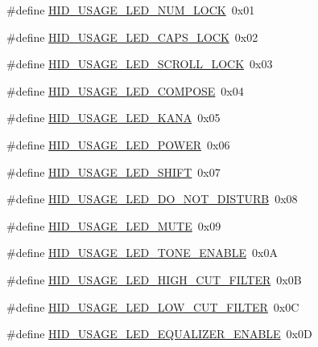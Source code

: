 \begin{DoxyCompactItemize}
\item 
\#define \hyperlink{group__USBD__HID_ga36ce120868adf30bbd161bb7dc158381}{H\-I\-D\-\_\-\-U\-S\-A\-G\-E\-\_\-\-L\-E\-D\-\_\-\-N\-U\-M\-\_\-\-L\-O\-C\-K}~0x01
\item 
\#define \hyperlink{group__USBD__HID_gae6f37265467778fb821c13aacfb874f4}{H\-I\-D\-\_\-\-U\-S\-A\-G\-E\-\_\-\-L\-E\-D\-\_\-\-C\-A\-P\-S\-\_\-\-L\-O\-C\-K}~0x02
\item 
\#define \hyperlink{group__USBD__HID_ga65d50a5eda9c4d5664052d524d362aa4}{H\-I\-D\-\_\-\-U\-S\-A\-G\-E\-\_\-\-L\-E\-D\-\_\-\-S\-C\-R\-O\-L\-L\-\_\-\-L\-O\-C\-K}~0x03
\item 
\#define \hyperlink{group__USBD__HID_ga24e2ff6f63b971ae8ac48b2fa0c4a3e2}{H\-I\-D\-\_\-\-U\-S\-A\-G\-E\-\_\-\-L\-E\-D\-\_\-\-C\-O\-M\-P\-O\-S\-E}~0x04
\item 
\#define \hyperlink{group__USBD__HID_ga0358c17c119b7b06e426eaf9c165c51c}{H\-I\-D\-\_\-\-U\-S\-A\-G\-E\-\_\-\-L\-E\-D\-\_\-\-K\-A\-N\-A}~0x05
\item 
\#define \hyperlink{group__USBD__HID_ga0fc37c52b98493e8624b79cd4ba38069}{H\-I\-D\-\_\-\-U\-S\-A\-G\-E\-\_\-\-L\-E\-D\-\_\-\-P\-O\-W\-E\-R}~0x06
\item 
\#define \hyperlink{group__USBD__HID_gaa6ef098f1cb5963537ab9fe7cc270d98}{H\-I\-D\-\_\-\-U\-S\-A\-G\-E\-\_\-\-L\-E\-D\-\_\-\-S\-H\-I\-F\-T}~0x07
\item 
\#define \hyperlink{group__USBD__HID_ga82d00da266c3f871bc2336baeb101418}{H\-I\-D\-\_\-\-U\-S\-A\-G\-E\-\_\-\-L\-E\-D\-\_\-\-D\-O\-\_\-\-N\-O\-T\-\_\-\-D\-I\-S\-T\-U\-R\-B}~0x08
\item 
\#define \hyperlink{group__USBD__HID_gad7c327bb6d5f71b16aa1823220d74254}{H\-I\-D\-\_\-\-U\-S\-A\-G\-E\-\_\-\-L\-E\-D\-\_\-\-M\-U\-T\-E}~0x09
\item 
\#define \hyperlink{group__USBD__HID_gad2bd4321ce65e012ab24b7e1cbb7ae64}{H\-I\-D\-\_\-\-U\-S\-A\-G\-E\-\_\-\-L\-E\-D\-\_\-\-T\-O\-N\-E\-\_\-\-E\-N\-A\-B\-L\-E}~0x0\-A
\item 
\#define \hyperlink{group__USBD__HID_gae28056389c74cec9b970183d9e2853e0}{H\-I\-D\-\_\-\-U\-S\-A\-G\-E\-\_\-\-L\-E\-D\-\_\-\-H\-I\-G\-H\-\_\-\-C\-U\-T\-\_\-\-F\-I\-L\-T\-E\-R}~0x0\-B
\item 
\#define \hyperlink{group__USBD__HID_ga2ca4f7cb4ce5ab8e3e8c78a5a65449bd}{H\-I\-D\-\_\-\-U\-S\-A\-G\-E\-\_\-\-L\-E\-D\-\_\-\-L\-O\-W\-\_\-\-C\-U\-T\-\_\-\-F\-I\-L\-T\-E\-R}~0x0\-C
\item 
\#define \hyperlink{group__USBD__HID_ga5e1b129c958ac19634d4100ba5e80291}{H\-I\-D\-\_\-\-U\-S\-A\-G\-E\-\_\-\-L\-E\-D\-\_\-\-E\-Q\-U\-A\-L\-I\-Z\-E\-R\-\_\-\-E\-N\-A\-B\-L\-E}~0x0\-D

\end{DoxyCompactItemize}
